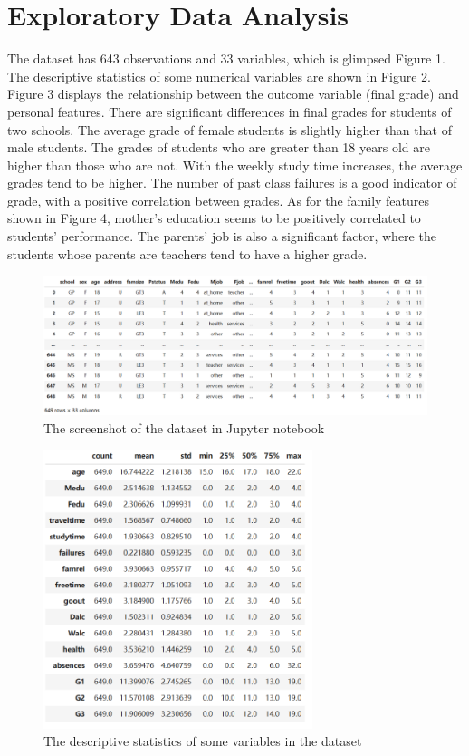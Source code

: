 \documentclass[sn-mathphys-num]{sn-jnl}%
\theoremstyle{thmstyleone}%
\theoremstyle{thmstyletwo}%
\theoremstyle{thmstylethree}%
\begin{document}
\section{Exploratory Data Analysis}

The dataset has 643 observations and 33 variables, which is glimpsed Figure 1. The descriptive statistics of some numerical variables are shown in Figure 2. Figure 3 displays the relationship between the outcome variable (final grade) and personal features. There are significant differences in final grades for students of two schools. The average grade of female students is slightly higher than that of male students. The grades of students who are greater than 18 years old are higher than those who are not. With the weekly study time increases, the average grades tend to be higher.  The number of past class failures is a good indicator of grade, with a positive correlation between grades. As for the family features shown in Figure 4, mother's education seems to be positively correlated to students' performance. The parents' job is also a significant factor, where the students whose parents are teachers tend to have a higher grade.


\begin{figure}[h]\label{glimpse_data}
    \centering
    \includegraphics[width=\textwidth]{figure/fig1_glimpse_data.png}
    \caption{The screenshot of the dataset in Jupyter notebook}
\end{figure}

\begin{figure}[h]
    \centering
    \includegraphics[width=0.7\textwidth]{figure/fig2_description_data.png}
    \caption{The descriptive statistics of some variables in the dataset}
    \label{summary_data}
\end{figure}
\end{document}
